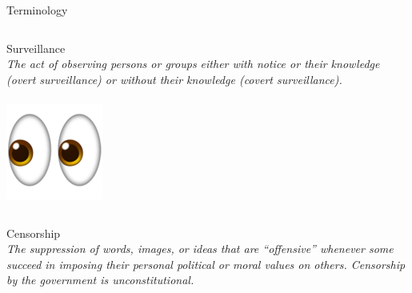 \documentclass[nobackground,dvipsnames,table,aspectratio=169]{beamer}
\begin{document}
\begin{frame}{Terminology}
    \begin{columns}[T]
            Surveillance\\
            \small{\textit{The act of observing persons or groups either with notice or their knowledge (overt surveillance) or without their knowledge (covert surveillance).}}\\~\\
            \includegraphics[width=\textwidth]{eyes}
    \end{columns}
    \vspace{0.05\textheight}
    \begin{columns}[T]
            Censorship\\
            \small{\textit{The suppression of words, images, or ideas that are “offensive” whenever some succeed in imposing their personal political or moral values on others. Censorship by the government is unconstitutional.}}\\~\\
        

\end{columns}
\end{frame}
\end{document}
